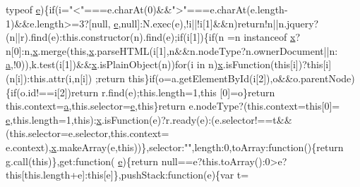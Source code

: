 \begin{DoxyCode}
      typeof \hyperlink{jquery-1_810_82_8min_8js_a2c038346d47955cbe2cb91e338edd7e1}{e})\{\textcolor{keywordflow}{if}(i=\textcolor{stringliteral}{"<"}===e.charAt(0)&&\textcolor{stringliteral}{">"}===e.charAt(e.length-1)&&e.length>=3?[null,
      \hyperlink{jquery-1_810_82_8min_8js_a2c038346d47955cbe2cb91e338edd7e1}{e},null]:N.exec(e),!i||!i[1]&&n)\textcolor{keywordflow}{return}!n||n.jquery?(n||r).find(e):this.constructor(n).find(e);\textcolor{keywordflow}{if}(i[1])\{\textcolor{keywordflow}{if}(n
      =n instanceof \hyperlink{jquery-1_810_82_8min_8js_a5ce50d751c9664d05375c8f5080ed43e}{x}?n[0]:n,\hyperlink{jquery-1_810_82_8min_8js_a5ce50d751c9664d05375c8f5080ed43e}{x}.merge(\textcolor{keyword}{this},\hyperlink{jquery-1_810_82_8min_8js_a5ce50d751c9664d05375c8f5080ed43e}{x}.parseHTML(i[1],n&&n.nodeType?n.ownerDocument||n:
      \hyperlink{bootstrap_8min_8js_ae8f6b400ed3390908c5cdeebed3a82b9}{a},!0)),k.test(i[1])&&\hyperlink{jquery-1_810_82_8min_8js_a5ce50d751c9664d05375c8f5080ed43e}{x}.isPlainObject(n))\textcolor{keywordflow}{for}(i in n)\hyperlink{jquery-1_810_82_8min_8js_a5ce50d751c9664d05375c8f5080ed43e}{x}.isFunction(\textcolor{keyword}{this}[i])?\textcolor{keyword}{this}[i](n[i]):this.attr(i,n[i])
      ;\textcolor{keywordflow}{return} \textcolor{keyword}{this}\}\textcolor{keywordflow}{if}(o=a.getElementById(i[2]),o&&o.parentNode)\{\textcolor{keywordflow}{if}(o.id!==i[2])\textcolor{keywordflow}{return} r.find(e);this.length=1,\textcolor{keyword}{this}
      [0]=o\}\textcolor{keywordflow}{return} this.context=\hyperlink{bootstrap_8min_8js_ae8f6b400ed3390908c5cdeebed3a82b9}{a},this.selector=\hyperlink{jquery-1_810_82_8min_8js_a2c038346d47955cbe2cb91e338edd7e1}{e},\textcolor{keyword}{this}\}\textcolor{keywordflow}{return} e.nodeType?(this.context=\textcolor{keyword}{this}[0]=
      \hyperlink{jquery-1_810_82_8min_8js_a2c038346d47955cbe2cb91e338edd7e1}{e},this.length=1,\textcolor{keyword}{this}):\hyperlink{jquery-1_810_82_8min_8js_a5ce50d751c9664d05375c8f5080ed43e}{x}.isFunction(e)?r.ready(e):(e.selector!==t&&(this.selector=e.selector,this.context=
      e.context),\hyperlink{jquery-1_810_82_8min_8js_a5ce50d751c9664d05375c8f5080ed43e}{x}.makeArray(e,\textcolor{keyword}{this}))\},selector:\textcolor{stringliteral}{""},length:0,toArray:\textcolor{keyword}{function}()\{\textcolor{keywordflow}{return} g.call(\textcolor{keyword}{this})\},\textcolor{keyword}{get}:\textcolor{keyword}{function}(
      \hyperlink{jquery-1_810_82_8min_8js_a2c038346d47955cbe2cb91e338edd7e1}{e})\{\textcolor{keywordflow}{return} null==e?this.toArray():0>e?this[this.length+e]:this[e]\},pushStack:function(e)\{var t=

\end{DoxyCode}
